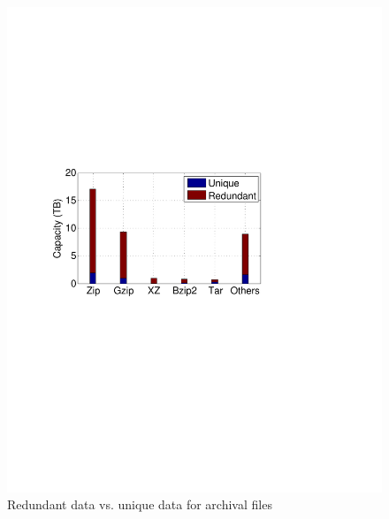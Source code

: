 \begin{figure}[t]
\begin{minipage}{0.278\textwidth}
		\includegraphics[width=1\textwidth]{graphs/type-tar-type}
		\caption{Redundant data vs. unique data for archival files}
		\label{fig:type-arch}
	\end{minipage}
	\begin{minipage}{0.28\textwidth}
		\centering

\end{minipage}
\end{figure}
